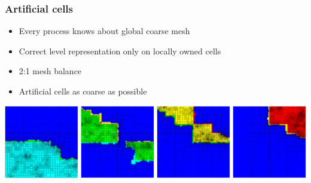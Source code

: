 \begin{frame}
\frametitle{Artificial cells}

\begin{itemize}
\item Every process knows about global coarse mesh
\item Correct level representation only on locally owned cells
\item 2:1 mesh balance
\item Artificial cells as coarse as possible
\end{itemize}

\vfill{}

\includegraphics[width=\textwidth]{addendum/figures/artificial.png}
\end{frame}